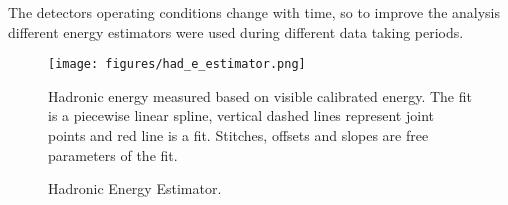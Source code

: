 The detectors operating conditions change with time, so to improve the analysis different energy estimators were used
during different data taking periods.
\begin{figure}[t]
\texttt{[image: figures/had\_e\_estimator.png]}
\centering
\caption{Hadronic Energy Estimator.}
{Hadronic energy measured based on visible calibrated energy. The fit is a piecewise linear spline, vertical 
dashed lines represent joint points and red line is a fit. Stitches, offsets and slopes are free parameters of the
fit.}
\label{fig:hade_fit}
\end{figure}
